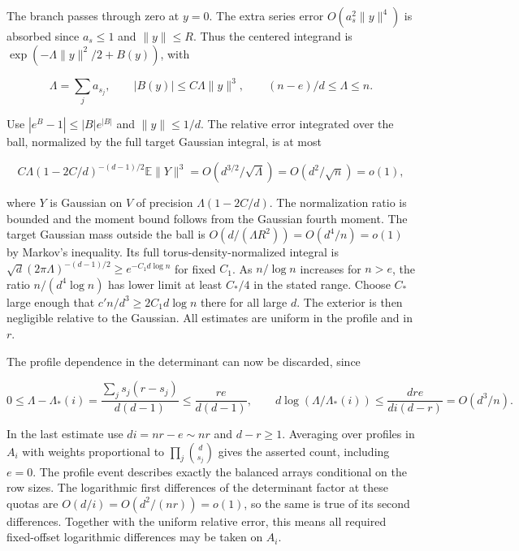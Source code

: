 The branch passes through zero at $y=0$. The extra series error $O(a_s^2\|y\|^4)$ is absorbed since $a_s\le1$ and $\|y\|\le R$. Thus the centered integrand is $\exp(-\Lambda\|y\|^2/2+B(y))$, with

\begin{equation*}
\Lambda=\sum_j a_{s_j},\qquad |B(y)|\le C\Lambda\|y\|^3,\qquad
(n-e)/d\le\Lambda\le n.
\end{equation*}

Use $|e^B-1|\le |B|e^{|B|}$ and $\|y\|\le1/d$. The relative error integrated over the ball, normalized by the full target Gaussian integral, is at most

\begin{equation*}
C\Lambda(1-2C/d)^{-(d-1)/2}\mathbb E\|Y\|^3
=O(d^{3/2}/\sqrt\Lambda)=O(d^2/\sqrt n)=o(1),
\end{equation*}

where $Y$ is Gaussian on $V$ of precision $\Lambda(1-2C/d)$. The normalization ratio is bounded and the moment bound follows from the Gaussian fourth moment. The target Gaussian mass outside the ball is $O(d/(\Lambda R^2))=O(d^4/n)=o(1)$ by Markov's inequality. Its full torus-density-normalized integral is $\sqrt d(2\pi\Lambda)^{-(d-1)/2}\ge e^{-C_1d\log n}$ for fixed $C_1$. As $n/\log n$ increases for $n>e$, the ratio $n/(d^4\log n)$ has lower limit at least $C_*/4$ in the stated range. Choose $C_*$ large enough that $c'n/d^3\ge 2C_1 d\log n$ there for all large $d$. The exterior is then negligible relative to the Gaussian. All estimates are uniform in the profile and in $r$.

The profile dependence in the determinant can now be discarded, since

\begin{equation*}
0\le \Lambda-\Lambda_*(i)
=\frac{\sum_j s_j(r-s_j)}{d(d-1)}\le\frac{re}{d(d-1)},
\qquad
d\log(\Lambda/\Lambda_*(i))
\le\frac{dre}{di(d-r)}
=O(d^3/n).
\end{equation*}

In the last estimate use $di=nr-e\sim nr$ and $d-r\ge1$. Averaging over profiles in $A_i$ with weights proportional to $\prod_j\binom d{s_j}$ gives the asserted count, including $e=0$. The profile event describes exactly the balanced arrays conditional on the row sizes. The logarithmic first differences of the determinant factor at these quotas are $O(d/i)=O(d^2/(nr))=o(1)$, so the same is true of its second differences. Together with the uniform relative error, this means all required fixed-offset logarithmic differences may be taken on $A_i$.

